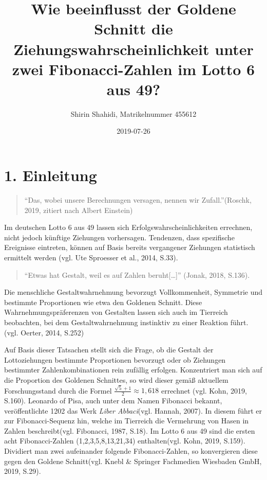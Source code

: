 \documentclass[ngerman,]{article}
\title{Wie beeinflusst der Goldene Schnitt die Ziehungswahrscheinlichkeit unter
zwei Fibonacci-Zahlen im Lotto 6 aus 49?}
\author{Shirin Shahidi, Matrikelnummer 455612}
\date{2019-07-26}
\begin{document}
\maketitle

{
\setcounter{tocdepth}{2}
\tableofcontents
}
\newpage

\listoffigures

\newpage

\listoftables

\newpage

\section{1. Einleitung}\label{einleitung}

\begin{quote}
``Das, wobei unsere Berechnungen versagen, nennen wir Zufall.''(Roschk,
2019, zitiert nach Albert Einstein)
\end{quote}

Im deutschen Lotto 6 aus 49 lassen sich Erfolgswahrscheinlichkeiten
errechnen, nicht jedoch künftige Ziehungen vorhersagen. Tendenzen, dass
spezifische Ereignisse eintreten, können auf Basis bereits vergangener
Ziehungen statistisch ermittelt werden (vgl. Ute Sproesser et al., 2014,
S.33).

\begin{quote}
``Etwas hat Gestalt, weil es auf Zahlen beruht{[}\ldots{}{]}'' (Jonak,
2018, S.136).
\end{quote}

Die menschliche Gestaltwahrnehmung bevorzugt Vollkommenheit, Symmetrie
und bestimmte Proportionen wie etwa den Goldenen Schnitt. Diese
Wahrnehmungspräferenzen von Gestalten lassen sich auch im Tierreich
beobachten, bei dem Gestaltwahrnehmung instinktiv zu einer Reaktion
führt. (vgl. Oerter, 2014, S.252)

Auf Basis dieser Tatsachen stellt sich die Frage, ob die Gestalt der
Lottoziehungen bestimmte Proportionen bevorzugt oder ob Ziehungen
bestimmter Zahlenkombinationen rein zufällig erfolgen. Konzentriert man
sich auf die Proportion des Goldenen Schnittes, so wird dieser gemäß
aktuellem Forschungsstand durch die Formel
\(\frac{\sqrt{5} + 1}{2}\approx1,618\) errechnet (vgl. Kohn, 2019,
S.160). Leonardo of Pisa, auch unter dem Namen Fibonacci bekannt,
veröffentlichte 1202 das Werk \emph{Liber Abbaci}(vgl. Hannah, 2007). In
diesem führt er zur Fibonacci-Sequenz hin, welche im Tierreich die
Vermehrung von Hasen in Zahlen beschreibt(vgl. Fibonacci, 1987, S.18).
Im Lotto 6 aus 49 sind die ersten acht Fibonacci-Zahlen
(1,2,3,5,8,13,21,34) enthalten(vgl. Kohn, 2019, S.159). Dividiert man
zwei aufeinander folgende Fibonacci-Zahlen, so konvergieren diese gegen
den Goldene Schnitt(vgl. Knebl \& Springer Fachmedien Wiesbaden GmbH,
2019, S.29).
\end{document}
